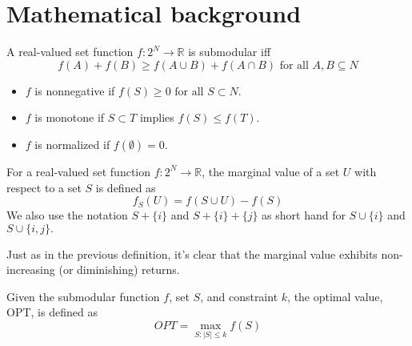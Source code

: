 \documentclass[11pt, a4paper]{article}
\begin{document}
\section{Mathematical background}
\begin{definition}
A real-valued set function $f: 2^{N} \rightarrow  \mathbb{R}$ is submodular iff
\begin{equation}
   f(A)+f(B) \geq f(A \cup B)+f(A \cap B)\text{ for all }  A, B \subseteq N  
\end{equation}
\begin{itemize}
    \item $f$ is nonnegative if $f(S) \geq 0 \text{ for all } S \subset N.$
    \item  $f$ is monotone if $S \subset T$ implies $f(S) \leq f(T).$
    \item  $f$ is normalized if $f(\emptyset) = 0.$
\end{itemize}

\end{definition}

 
\begin{definition}
For a real-valued set function $f : 2^N \rightarrow  \mathbb{R}$, the marginal value of a set $U$ with respect to a set $S$ is defined as
\begin{equation}
    f_{S}(U) = f(S \cup U)-f(S)
\end{equation}
We also use the notation $S + \{i\}$ and $S + \{i\} + \{j\}$ as short hand for $S \cup \{i\}$ and $S \cup \{i, j\}.$ 
\end{definition}


Just as in the previous definition, it's clear that the marginal value exhibits non-increasing (or diminishing) returns. 

\begin{definition}
Given the submodular function $f$, set $S$, and constraint $k$, the optimal value, OPT, is defined as
\begin{equation}
  O P T=\max _{S:|S| \leq k} f(S)  
\end{equation}
\end{definition}
\end{document}
